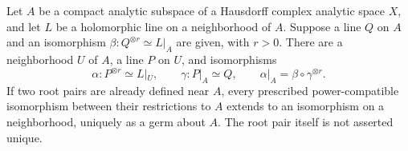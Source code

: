 \begin{lemma}
\label{lem:root-neighborhood}
Let \(A\) be a compact analytic subspace of a Hausdorff complex analytic
space \(X\), and let \(L\) be a holomorphic line on a neighborhood of
\(A\).  Suppose a line \(Q\) on \(A\) and an isomorphism
\(\beta:Q^{\otimes r}\simeq L|_A\) are given, with \(r>0\).
There are a neighborhood \(U\) of \(A\), a line \(P\) on \(U\), and
isomorphisms
\[
 \alpha:P^{\otimes r}\simeq L|_U,\qquad \gamma:P|_A\simeq Q,
 \qquad \alpha|_A=\beta\circ\gamma^{\otimes r}.
\]
If two root pairs are already defined near \(A\), every prescribed
power-compatible isomorphism between their restrictions to \(A\) extends
to an isomorphism on a neighborhood, uniquely as a germ about \(A\).
The root pair itself is not asserted unique.
\end{lemma}
